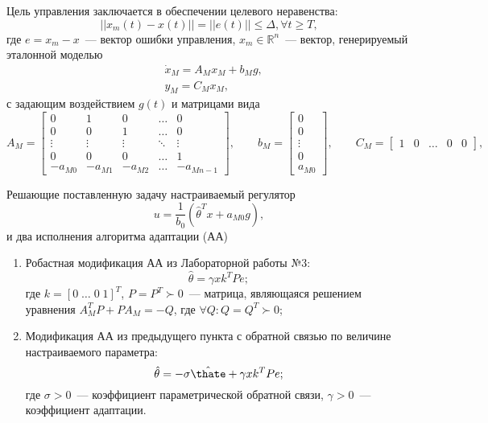 Цель управления заключается в обеспечении целевого неравенства:
\begin{equation}\label{eq_goal_of_control}
	||x_m(t) - x(t)|| = ||e(t)|| \le \Delta, \forall t \ge T,
\end{equation}
где $e = x_m - x$~--- вектор ошибки управления, $x_m \in \mathbb{R}^n$~--- вектор, генерируемый эталонной моделью
\begin{equation}
    \begin{aligned}
        & \dot{x}_M = A_M x_M + b_M g, \\
        & y_M = C_M x_M,
    \end{aligned}
\end{equation}
с задающим воздействием $g(t)$ и матрицами вида
\begin{equation}
    A_M =
    \begin{bmatrix}
        0 & 1 & 0 & \ldots & 0 \\
        0 & 0 & 1 & \ldots & 0 \\
        \vdots & \vdots & \vdots & \ddots & \vdots \\
        0 & 0 & 0 & \ldots & 1 \\
        -a_{M0} & -a_{M1} & -a_{M2} & \ldots & -a_{Mn-1}
    \end{bmatrix}\!\!,
    \qquad
    b_M =
    \begin{bmatrix}
        0 \\ 0 \\ \vdots \\ 0 \\ a_{M0}
    \end{bmatrix}\!\!,
    \qquad
    C_M =
    \begin{bmatrix}
        1 & 0 & \ldots & 0 & 0
    \end{bmatrix}\!\!,
\end{equation}

Решающие поставленную задачу настраиваемый регулятор
\begin{equation}\label{eq_tuned_controller}
    u = \frac{1}{b_0} (\hat\theta^T x + a_{M0} g),
\end{equation}
и два исполнения алгоритма адаптации (АА)
\begin{enumerate}[1.]
	\item Робастная модификация АА из Лабораторной работы №3:
	\begin{equation}\label{AA1}
		\hat\theta = \gamma x k^T P e;
	\end{equation}
	где $k = [0\;\ldots\;0\;1]^T$, $P=P^T \succ 0$~--- матрица, являющаяся решением уравнения $A^T_M P + P A_M =-Q$, где $\forall Q : Q=Q^T \succ 0$;
	
	\item Модификация АА из предыдущего пункта с обратной связью по величине настраиваемого параметра:
	\begin{equation}\label{AA2}
		\hat\theta = - \sigma \hat\thate + \gamma x k^T P e;
	\end{equation}
	где $\sigma > 0$~--- коэффициент параметрической обратной связи, $\gamma > 0$~--- коэффициент адаптации.
\end{enumerate}


